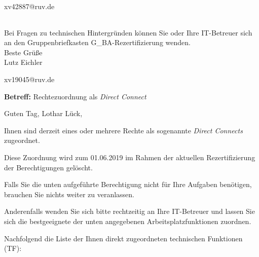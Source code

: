 \documentclass[a4paper,landscape,12pt]{letter}
\begin{document}
\begin{letter}{xv42887@ruv.de\hfill \break}
\begin{tiny}
\begin{longtable}{|p{35mm}|p{15mm}|p{25mm}|p{10mm}|p{40mm}|p{50mm}|p{50mm}|}
\hline
		\end{longtable}
		\end{tiny}
	
\begin{minipage}{\textwidth}
			Bei Fragen zu technischen Hintergründen können Sie 
			oder Ihre IT-Betreuer sich an den Gruppenbriefkasten 
			G\_BA-Rezertifizierung
			wenden.\\
			\linebreak
			Beste Grüße\\
			Lutz Eichler
	\end{minipage}
	\end{letter}
	
\begin{letter}{xv19045@ruv.de\hfill \break}
\begin{normalsize}
	\opening{\textbf{Betreff:} Rechtezuordnung als \emph{Direct Connect}}
	\begin{normalsize} \hfill
	\end{normalsize}

	\begin{normalsize}
		Guten Tag, 
	Lothar Lück, \hfill \break
	\end{normalsize}
	\end{normalsize}
	
\begin{normalsize}
	Ihnen sind derzeit eines oder mehrere Rechte als sogenannte \emph{Direct Connects} zugeordnet.
	
	Diese Zuordnung wird zum 01.06.2019 im Rahmen der aktuellen Rezertifizierung der Berechtigungen gelöscht.
	
	Falls Sie die unten aufgeführte Berechtigung nicht für Ihre Aufgaben benötigen, 
	brauchen Sie nichts weiter zu veranlassen.
	
	Anderenfalls wenden Sie sich bitte rechtzeitig an Ihre IT-Betreuer 
	und lassen Sie sich die bestgeeignete der unten angegebenen Arbeitsplatzfunktionen zuordnen.
	\end{normalsize}
	
\begin{normalsize}
	Nachfolgend die Liste der Ihnen direkt zugeordneten technischen Funktionen (TF):


\end{normalsize}
\end{letter}
\end{document}
